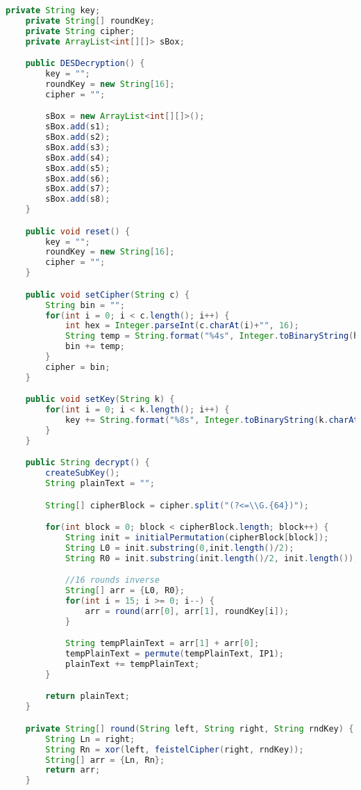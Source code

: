 \begin{lstlisting}[language=Java,basicstyle=\tiny,caption=DESDecryption.java]
    private String key;
    private String[] roundKey;
    private String cipher;
    private ArrayList<int[][]> sBox;

    public DESDecryption() {
        key = "";
        roundKey = new String[16];
        cipher = "";

        sBox = new ArrayList<int[][]>();
        sBox.add(s1);
        sBox.add(s2);
        sBox.add(s3);
        sBox.add(s4);
        sBox.add(s5);
        sBox.add(s6);
        sBox.add(s7);
        sBox.add(s8);
    }

    public void reset() {
        key = "";
        roundKey = new String[16];
        cipher = "";
    }

    public void setCipher(String c) {
        String bin = "";
        for(int i = 0; i < c.length(); i++) {
            int hex = Integer.parseInt(c.charAt(i)+"", 16);
            String temp = String.format("%4s", Integer.toBinaryString(hex)).replace(' ', '0');
            bin += temp;
        }
        cipher = bin;
    }

    public void setKey(String k) {
        for(int i = 0; i < k.length(); i++) {
            key += String.format("%8s", Integer.toBinaryString(k.charAt(i))).replace(' ', '0');
        }
    }

    public String decrypt() {
        createSubKey();
        String plainText = "";

        String[] cipherBlock = cipher.split("(?<=\\G.{64})");

        for(int block = 0; block < cipherBlock.length; block++) {
            String init = initialPermutation(cipherBlock[block]);
            String L0 = init.substring(0,init.length()/2);
            String R0 = init.substring(init.length()/2, init.length());

            //16 rounds inverse
            String[] arr = {L0, R0};
            for(int i = 15; i >= 0; i--) {
                arr = round(arr[0], arr[1], roundKey[i]);
            }

            String tempPlainText = arr[1] + arr[0];
            tempPlainText = permute(tempPlainText, IP1);
            plainText += tempPlainText;
        }

        return plainText;
    }

    private String[] round(String left, String right, String rndKey) {
        String Ln = right;
        String Rn = xor(left, feistelCipher(right, rndKey));
        String[] arr = {Ln, Rn};
        return arr;
    }


\end{lstlisting}
